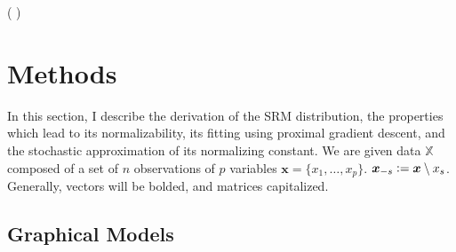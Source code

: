 \documentclass{samkoelleprelimworking}
\newcommand{\vmcomment}[1]{({\color{blue}{VM's comment:}} \textbf{\color{blue}{#1}})}
\begin{document}
\vmcomment{I hope that when you add references, the story of what has been done in the past will become more clear. Also, would be nice to have examples of MRF usage to solve concrete problems.}

\section{Methods}

In this section, I describe the derivation of the SRM distribution, the properties which lead to its normalizability, its fitting using proximal gradient descent, and the stochastic approximation of its normalizing constant.  We are given data $\mathbb{X}$ composed of a set of $n$ observations of $p$ variables $\bm{x} = \{x_1, \dotsc , x_p\}$.  $\bm{x}_{-s} \vcentcolon = \bm{x} \setminus x_s$. Generally, vectors will be bolded, and matrices capitalized.

 \subsection{Graphical Models}
 
\end{document}
